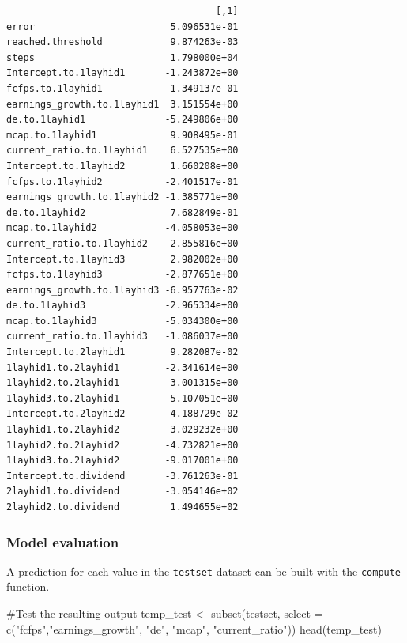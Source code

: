 \documentclass[
  letterpaper,
  DIV=11,
  numbers=noendperiod,
  oneside]{scrartcl}
\newenvironment{Shaded}{\begin{snugshade}}{\end{snugshade}}
\newcommand{\AttributeTok}[1]{\textcolor[rgb]{0.40,0.45,0.13}{#1}}
\newcommand{\CommentTok}[1]{\textcolor[rgb]{0.37,0.37,0.37}{#1}}
\newcommand{\FunctionTok}[1]{\textcolor[rgb]{0.28,0.35,0.67}{#1}}
\newcommand{\NormalTok}[1]{\textcolor[rgb]{0.00,0.23,0.31}{#1}}
\newcommand{\OtherTok}[1]{\textcolor[rgb]{0.00,0.23,0.31}{#1}}
\newcommand{\SpecialCharTok}[1]{\textcolor[rgb]{0.37,0.37,0.37}{#1}}
\newcommand{\StringTok}[1]{\textcolor[rgb]{0.13,0.47,0.30}{#1}}
\begin{document}
\begin{Shaded}
\end{Shaded}

\begin{verbatim}
                                     [,1]
error                        5.096531e-01
reached.threshold            9.874263e-03
steps                        1.798000e+04
Intercept.to.1layhid1       -1.243872e+00
fcfps.to.1layhid1           -1.349137e-01
earnings_growth.to.1layhid1  3.151554e+00
de.to.1layhid1              -5.249806e+00
mcap.to.1layhid1             9.908495e-01
current_ratio.to.1layhid1    6.527535e+00
Intercept.to.1layhid2        1.660208e+00
fcfps.to.1layhid2           -2.401517e-01
earnings_growth.to.1layhid2 -1.385771e+00
de.to.1layhid2               7.682849e-01
mcap.to.1layhid2            -4.058053e+00
current_ratio.to.1layhid2   -2.855816e+00
Intercept.to.1layhid3        2.982002e+00
fcfps.to.1layhid3           -2.877651e+00
earnings_growth.to.1layhid3 -6.957763e-02
de.to.1layhid3              -2.965334e+00
mcap.to.1layhid3            -5.034300e+00
current_ratio.to.1layhid3   -1.086037e+00
Intercept.to.2layhid1        9.282087e-02
1layhid1.to.2layhid1        -2.341614e+00
1layhid2.to.2layhid1         3.001315e+00
1layhid3.to.2layhid1         5.107051e+00
Intercept.to.2layhid2       -4.188729e-02
1layhid1.to.2layhid2         3.029232e+00
1layhid2.to.2layhid2        -4.732821e+00
1layhid3.to.2layhid2        -9.017001e+00
Intercept.to.dividend       -3.761263e-01
2layhid1.to.dividend        -3.054146e+02
2layhid2.to.dividend         1.494655e+02
\end{verbatim}

\hypertarget{model-evaluation}{%
\subsubsection{Model evaluation}\label{model-evaluation}}

A prediction for each value in the \texttt{testset} dataset can be built
with the \texttt{compute} function.

\begin{Shaded}
\begin{Highlighting}[]
\CommentTok{\#Test the resulting output}
\NormalTok{temp\_test }\OtherTok{\textless{}{-}} \FunctionTok{subset}\NormalTok{(testset, }\AttributeTok{select =}
                      \FunctionTok{c}\NormalTok{(}\StringTok{"fcfps"}\NormalTok{,}\StringTok{"earnings\_growth"}\NormalTok{, }
                        \StringTok{"de"}\NormalTok{, }\StringTok{"mcap"}\NormalTok{, }\StringTok{"current\_ratio"}\NormalTok{))}
\FunctionTok{head}\NormalTok{(temp\_test)}
\end{Highlighting}
\end{Shaded}
\end{document}
